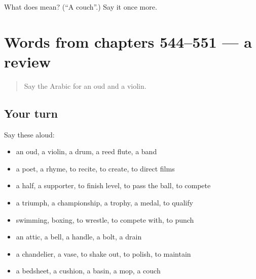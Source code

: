 \begin{tcolorbox}[breakable,colback=teal!4,colframe=teal!35!black,title={Before you move on}]
What does  mean? (\textquotedblleft{}A couch\textquotedblright{}.) Say it once more.
\end{tcolorbox}
\section[(dialogue)]{Words from chapters 544–551 — a review}

\label{lesson:AR-R551-review-544-551}



\begin{quote}
Say the Arabic for an oud and a violin.
\end{quote}

\subsection*{Your turn}
Say these aloud:

\begin{itemize}
\raggedright
  \item an oud, a violin, a drum, a reed flute, a band
  \item a poet, a rhyme, to recite, to create, to direct films
  \item a half, a supporter, to finish level, to pass the ball, to compete
  \item a triumph, a championship, a trophy, a medal, to qualify
  \item swimming, boxing, to wrestle, to compete with, to punch
  \item an attic, a bell, a handle, a bolt, a drain
  \item a chandelier, a vase, to shake out, to polish, to maintain
  \item a bedsheet, a cushion, a basin, a mop, a couch
\end{itemize}


